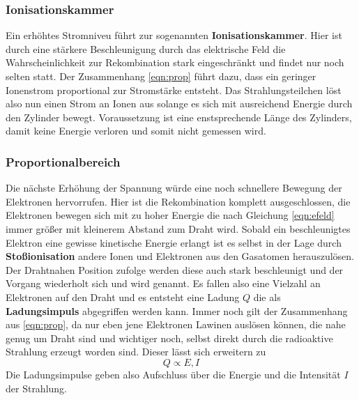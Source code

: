 \subsubsection{Ionisationskammer}
Ein erhöhtes Stromniveu führt zur sogenannten \textbf{Ionisationskammer}. Hier ist durch eine stärkere Beschleunigung durch das elektrische Feld die Wahrscheinlichkeit zur Rekombination stark eingeschränkt und findet nur noch selten statt. 
Der Zusammenhang \eqref{eqn:prop} führt dazu, dass ein geringer Ionenstrom proportional zur Stromstärke entsteht.
Das Strahlungsteilchen löst also nun einen Strom an Ionen aus solange es sich mit ausreichend Energie durch den Zylinder bewegt. Voraussetzung ist eine enstsprechende Länge des Zylinders, damit keine Energie verloren und somit nicht gemessen wird.
\subsubsection{Proportionalbereich}
\label{sub:porpotional}
Die nächste Erhöhung der Spannung würde eine noch schnellere Bewegung der Elektronen hervorrufen. Hier ist die Rekombination komplett ausgeschlossen, die Elektronen bewegen sich mit zu hoher Energie die nach Gleichung \eqref{eqn:efeld} immer größer mit kleinerem Abstand zum Draht wird.
Sobald ein beschleunigtes Elektron eine gewisse kinetische Energie erlangt ist es selbst in der Lage durch \textbf{Stoßionisation} andere Ionen und Elektronen aus den Gasatomen herauszulösen. Der Drahtnahen Position zufolge werden diese auch stark beschleunigt und der Vorgang wiederholt sich
und wird  genannt. Es fallen also eine Vielzahl an Elektronen auf den Draht und es entsteht eine Ladung $Q$ die als \textbf{Ladungsimpuls} abgegriffen werden kann. 
Immer noch gilt der Zusammenhang aus \eqref{eqn:prop}, da nur eben jene Elektronen Lawinen auslösen können, die nahe genug um Draht sind und wichtiger noch, selbst direkt durch die radioaktive Strahlung erzeugt worden sind. Dieser lässt sich erweitern zu
\begin{equation*}
\label{eqn:prop2}
Q \propto E, I
\end{equation*}
Die Ladungsimpulse geben also Aufschluss über die Energie und die Intensität $I$ der Strahlung. 
